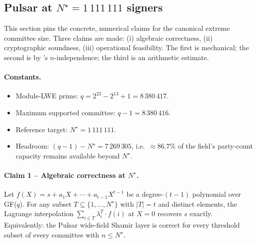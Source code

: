 
\subsection*{Pulsar at $N^\star = 1\,111\,111$ signers}

This section pins the concrete, numerical claims for the canonical
extreme committee size. Three claims are made: (i) algebraic
correctness, (ii) cryptographic soundness, (iii) operational
feasibility. The first is mechanical; the second is by
's $n$-independence; the third is an
arithmetic estimate.

\paragraph{Constants.}
\begin{itemize}[leftmargin=*, itemsep=0pt]
\item Module-LWE prime: $q = 2^{23} - 2^{13} + 1 = 8\,380\,417$.
\item Maximum supported committee: $q - 1 = 8\,380\,416$.
\item Reference target: $N^\star = 1\,111\,111$.
\item Headroom: $(q - 1) - N^\star = 7\,269\,305$, i.e.\
  $\approx 86.7\%$ of the field's party-count capacity remains
  available beyond $N^\star$.
\end{itemize}

\paragraph{Claim 1 -- Algebraic correctness at $N^\star$.}

\begin{proposition}
\label{prop:pulsar-correct-at-N-star}
Let $f(X) = s + a_1 X + \cdots + a_{t-1} X^{t-1}$ be a degree-$(t-1)$
polynomial over GF($q$). For any subset $T \subseteq \{1, \dots, N^\star\}$
with $|T| = t$ and distinct elements, the Lagrange interpolation
$\sum_{i \in T} \lambda_i^T \cdot f(i)$ at $X = 0$ recovers $s$
exactly. Equivalently: the Pulsar wide-field Shamir layer is
correct for every threshold subset of every committee with $n \le
N^\star$.
\end{proposition}


